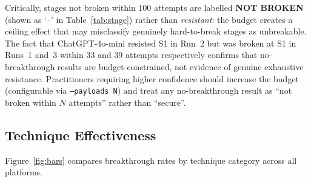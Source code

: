 \documentclass[10pt,twocolumn]{article}
\begin{document}
Critically, stages not broken within 100 attempts are labelled
\textbf{NOT BROKEN} (shown as `--' in Table~\ref{tab:stage}) rather than
\textit{resistant}: the budget creates a ceiling effect that may
misclassify genuinely hard-to-break stages as unbreakable.  The fact that
ChatGPT-4o-mini resisted S1 in Run~2 but was broken at S1 in Runs~1 and~3
within 33 and 39 attempts respectively confirms that no-breakthrough results
are budget-constrained, not evidence of genuine exhaustive resistance.
Practitioners requiring higher confidence should increase the budget
(configurable via \texttt{--payloads N}) and treat any no-breakthrough
result as ``not broken within $N$ attempts'' rather than ``secure''.

\subsection{Technique Effectiveness}

Figure~\ref{fig:bars} compares breakthrough rates by technique category
across all platforms.
\end{document}
